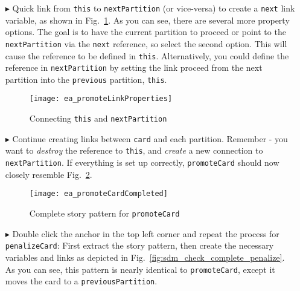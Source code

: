 \begin{itemize}
\vspace{0.5cm}

\item[$\blacktriangleright$] Quick link from \texttt{this} to \texttt{nextPartition} (or vice-versa) to create a \texttt{next} link variable, as shown in
Fig.~\ref{fig:sdm_check_link_variable}. As you can see, there are several more property options. The goal is to have the current partition to proceed or point
to the \texttt{nextPartition} via the \texttt{next} reference, so select the second option. This will cause the reference to be defined in \texttt{this}.
Alternatively, you could define the reference in \texttt{nextPartition} by setting the link proceed from the next partition into the \texttt{previous}
partition, \texttt{this}.

\begin{figure}[htbp]
\begin{center}
  \texttt{[image: ea\_promoteLinkProperties]}
  \caption{Connecting \texttt{this} and \texttt{nextPartition}}
  \label{fig:sdm_check_link_variable}
\end{center}
\end{figure}

\vspace{0.5cm}

\item[$\blacktriangleright$] Continue creating links between \texttt{card} and each partition. Remember - you want to \emph{destroy} the reference to
\texttt{this}, and \emph{create} a new connection to \texttt{nextPartition}. If everything is set up correctly, \texttt{promoteCard} should now closely resemble
Fig.~\ref{fig:sdm_check_complete_activity_node}.

\begin{figure}[htbp]
\begin{center}
  \texttt{[image: ea\_promoteCardCompleted]}
  \caption{Complete story pattern for \texttt{promoteCard}}
  \label{fig:sdm_check_complete_activity_node}
\end{center}
\end{figure}

\clearpage

\item[$\blacktriangleright$] Double click the anchor in the top left corner and repeat the process for \texttt{penalizeCard}: First extract the story pattern,
then create the necessary variables and links as depicted in Fig.~\ref{fig:sdm_check_complete_penalize}. As you can see, this pattern is nearly identical to
\texttt{promoteCard}, except it moves the card to a \texttt{previousPartition}.


\end{itemize}
